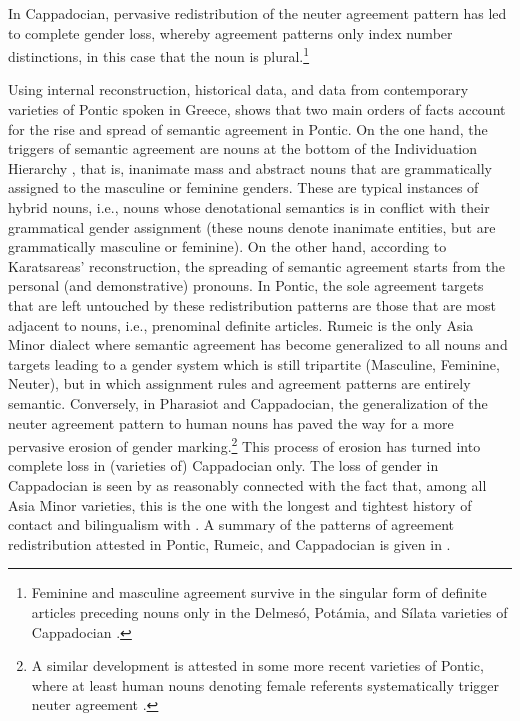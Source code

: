 \documentclass[output=collectionpaper]{langsci/langscibook}
\begin{document}
 
In Cappadocian, pervasive redistribution of the neuter agreement pattern has led to complete gender loss, whereby agreement patterns only index number distinctions, in this case that the noun is plural.\footnote{Feminine and masculine agreement survive in the singular form of definite articles preceding nouns only in the Delmes\'o, Pot\'amia, and S\'ilata varieties of Cappadocian \citep[97]{Karatsareas2014}.}

Using internal reconstruction, historical data, and data from contemporary varieties of Pontic spoken in Greece, \citet{Karatsareas2014} shows that two main orders of facts account for the rise and spread of semantic agreement in Pontic. On the one hand, the triggers of semantic agreement are nouns at the bottom of the Individuation Hierarchy \citep{Sasse1993}, that is, inanimate mass and abstract nouns that are grammatically assigned to the masculine or feminine genders. These are typical instances of hybrid nouns, i.e., nouns whose denotational semantics is in conflict with their grammatical gender assignment (these nouns denote inanimate entities, but are grammatically masculine or feminine).  On the other hand, according to Karatsareas' reconstruction, the spreading of semantic agreement starts from the personal (and demonstrative) pronouns. In Pontic, the sole agreement targets that are left untouched by these redistribution patterns are those that are most adjacent to nouns, i.e., prenominal definite articles. Rumeic is the only Asia Minor  dialect where semantic agreement has become generalized to all nouns and targets leading to a gender system which is still tripartite (Masculine, Feminine, Neuter), but in which assignment rules and agreement patterns are entirely semantic. Conversely, in Pharasiot and Cappadocian, the generalization of the neuter agreement pattern to human nouns has paved the way for a more pervasive erosion of gender marking.\footnote{A similar development is attested in some more recent varieties of Pontic, where at least human nouns denoting female referents systematically trigger neuter agreement \citep[96--97]{Karatsareas2014}. } This process of erosion has turned into complete loss in (varieties of) Cappadocian only. The loss of gender in Cappadocian  is seen by \citet[99]{Karatsareas2014} as reasonably connected with the fact that, among all Asia Minor  varieties, this is the one with the longest and tightest history of contact and bilingualism with . A summary of the patterns of agreement redistribution attested in Pontic, Rumeic, and Cappadocian  is given in .
\end{document}
